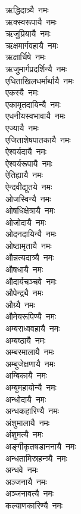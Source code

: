 \begin{multicols}{\maxColumns}
\begin{flushleft}
ऋद्धिदात्र्यै~नमः\\
ऋक्स्वरूपायै~नमः\\
ऋजुप्रियायै~नमः\\
ऋक्षमार्गवहायै~नमः\\
ऋक्षार्चिषे~नमः\\
ऋजुमार्गप्रदर्शिन्यै~नमः\\
एधिताखिलधर्मार्थायै~नमः\\
एकस्यै~नमः\\
एकामृतदायिन्यै~नमः\hfill{}\\
एधनीयस्वभावायै~नमः\\
एज्यायै~नमः\\
एजिताशेषपातकायै~नमः\\
ऐश्वर्यदायै~नमः\\
ऐश्वर्यरूपायै~नमः\\
ऐतिह्यायै~नमः\\
ऐन्दवीद्युतये~नमः\\
ओजस्विन्यै~नमः\\
ओषधिक्षेत्रायै~नमः\\
ओजोदायै~नमः\hfill{}\\
ओदनदायिन्यै~नमः\\
ओष्ठामृतायै~नमः\\
औन्नत्यदात्र्यै~नमः\\
औषधायै~नमः\\
औदार्यचञ्चवे~नमः\\
औपेन्द्र्यै~नमः\\
औग्र्यै~नमः\\
औमेयरूपिण्यै~नमः\\
अम्बराध्ववहायै~नमः\\
अम्बष्ठायै~नमः\hfill{}\\
अम्बरमालायै~नमः\\
अम्बुजेक्षणायै~नमः\\
अम्बिकायै~नमः\\
अम्बुमहायोन्यै~नमः\\
अन्धोदायै~नमः\\
अन्धकहारिण्यै~नमः\\
अंशुमालायै~नमः\\
अंशुमत्यै~नमः\\
अङ्गीकृतषडाननायै~नमः\\
अन्धतामिस्रहन्त्र्यै~नमः\hfill{}\\
अन्धवे~नमः\\
अञ्जनायै~नमः\\
अञ्जनावत्यै~नमः\\
कल्याणकारिण्यै~नमः\\

\end{flushleft}
\end{multicols}
